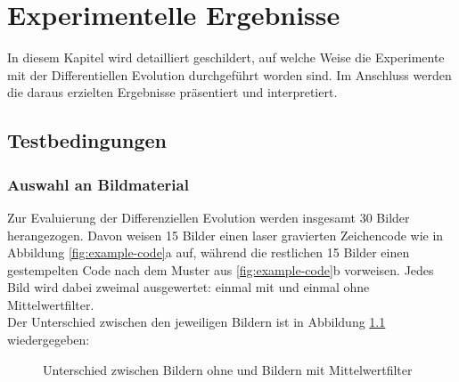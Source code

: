 \chapter{Experimentelle Ergebnisse}
\label{chap:results}
	In diesem Kapitel wird detailliert geschildert, auf welche Weise die Experimente mit der Differentiellen Evolution durchgeführt worden sind. Im Anschluss werden die daraus erzielten Ergebnisse präsentiert und interpretiert.
	
	\section{Testbedingungen}
	\label{sec:execution}
	
		\subsection{Auswahl an Bildmaterial}
		\label{sub:choice-of-images}
			Zur Evaluierung der Differenziellen Evolution werden insgesamt 30 Bilder herangezogen. Davon weisen 15 Bilder einen laser gravierten Zeichencode wie in Abbildung \ref{fig:example-code}a auf, während die restlichen 15 Bilder einen gestempelten Code nach dem Muster aus \ref{fig:example-code}b vorweisen. Jedes Bild wird dabei zweimal ausgewertet: einmal mit und einmal ohne Mittelwertfilter.\\
			Der Unterschied zwischen den jeweiligen Bildern ist in Abbildung \ref{fig:filter} wiedergegeben:
			\begin{figure}[H]
				\centering
				\quad
				
				\quad
				\caption{Unterschied zwischen Bildern ohne und Bildern mit Mittelwertfilter}
				\label{fig:filter}
			\end{figure}
	
